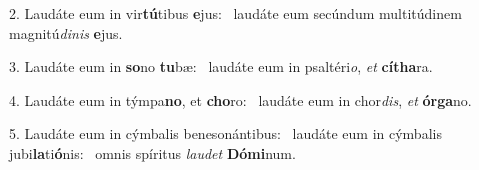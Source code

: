 2. Laudáte eum in vir\textbf{tú}tibus \textbf{e}jus: \ast\  laudáte eum secúndum multitúdinem magnitú\textit{di}\textit{nis} \textbf{e}jus.\

3. Laudáte eum in \textbf{so}no \textbf{tu}bæ: \ast\  laudáte eum in psaltéri\textit{o}, \textit{et} \textbf{cí}\textbf{tha}ra.\

4. Laudáte eum in týmpa\textbf{no}, et \textbf{cho}ro: \ast\  laudáte eum in chor\textit{dis}, \textit{et} \textbf{ór}\textbf{ga}no.\

5. Laudáte eum in cýmbalis benesonántibus: \dag\  laudáte eum in cýmbalis jubi\textbf{la}ti\textbf{ó}nis: \ast\  omnis spíritus \textit{lau}\textit{det} \textbf{Dó}\textbf{mi}num.\


